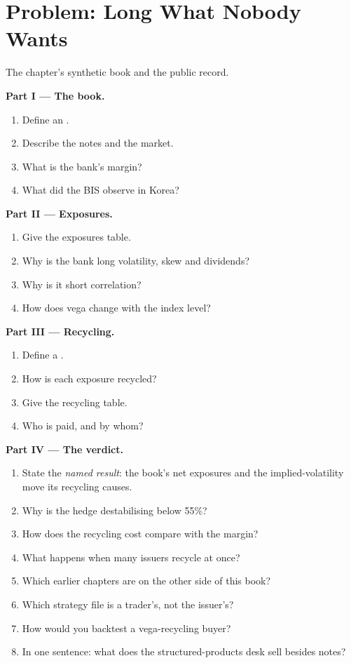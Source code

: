 \section{Problem: Long What Nobody Wants}

\begin{problem}\label{pb:s2:hedging-a-structured-products-book:1}
The chapter's synthetic book and the public record.

\medskip\noindent\textbf{Part I --- The book.}
\begin{enumerate}
\item Define an .
\item Describe the notes and the market.
\item What is the bank's margin?
\item What did the BIS observe in Korea?
\end{enumerate}

\medskip\noindent\textbf{Part II --- Exposures.}
\begin{enumerate}[resume]
\item Give the exposures table.
\item Why is the bank long volatility, skew and dividends?
\item Why is it short correlation?
\item How does vega change with the index level?
\end{enumerate}

\medskip\noindent\textbf{Part III --- Recycling.}
\begin{enumerate}[resume]
\item Define a .
\item How is each exposure recycled?
\item Give the recycling table.
\item Who is paid, and by whom?
\end{enumerate}

\medskip\noindent\textbf{Part IV --- The verdict.}
\begin{enumerate}[resume]
\item State the \emph{named result}: the book's net exposures and the implied-volatility move its recycling causes.
\item Why is the hedge destabilising below 55\%?
\item How does the recycling cost compare with the margin?
\item What happens when many issuers recycle at once?
\item Which earlier chapters are on the other side of this book?
\item Which strategy file is a trader's, not the issuer's?
\item How would you backtest a vega-recycling buyer?
\item In one sentence: what does the structured-products desk sell besides notes?
\end{enumerate}
\end{problem}

